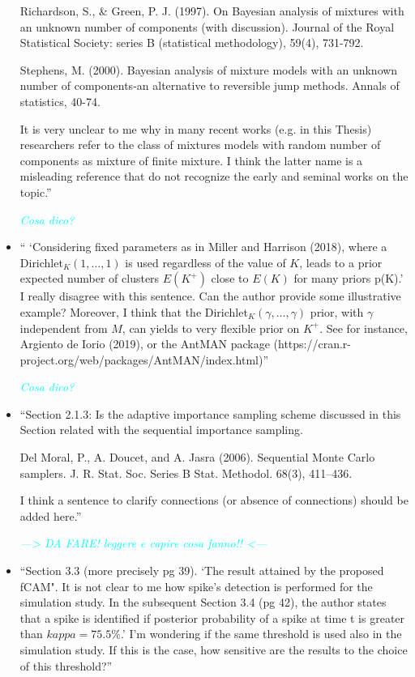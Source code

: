 \documentclass[11pt]{letter}
\begin{document}
\begin{itemize}
Richardson, S., \& Green, P. J. (1997). On Bayesian analysis of mixtures with an unknown number of components (with discussion). Journal of the Royal Statistical Society: series B (statistical methodology), 59(4), 731-792.

Stephens, M. (2000). Bayesian analysis of mixture models with an unknown number of components-an
alternative to reversible jump methods. Annals of statistics, 40-74.

It is very unclear to me why in many recent works (e.g. in this Thesis) researchers refer to the class of mixtures models with random number of components as mixture of finite mixture. I think the latter name is a misleading reference that do not recognize the early and seminal works on the topic.''\vskip1mm

{\em 
	\textcolor{cyan}{Cosa dico?}
}
\vskip3mm

%
\item `` `Considering fixed parameters as in Miller and Harrison (2018), where a Dirichlet$_K(1,\dots, 1)$ is used regardless of the value of $K$, leads to a prior expected number of clusters $E(K^+)$ close to $E(K)$ for many priors p(K).'\\
I really disagree with this sentence. Can the author provide some illustrative example? Moreover, I think that the Dirichlet$_K(\gamma,\dots, \gamma)$ prior, with $\gamma$ independent from $M$, can yields to very flexible prior on $K^+$. See for instance, Argiento de Iorio (2019), or the AntMAN package (https://cran.r-
project.org/web/packages/AntMAN/index.html)''\vskip1mm

{\em 
	\textcolor{cyan}{Cosa dico?}
}
\vskip3mm

%
\item ``Section 2.1.3:
Is the adaptive importance sampling scheme discussed in this Section related with the sequential importance
sampling.

Del Moral, P., A. Doucet, and A. Jasra (2006). Sequential Monte Carlo samplers. J. R. Stat. Soc. Series B Stat. Methodol. 68(3), 411–436.

I think a sentence to clarify connections (or absence of connections) should be added here.''\vskip1mm

{\em 
	\textcolor{cyan}{---> DA FARE! leggere e capire cosa fanno!! <---}
}
\vskip3mm

%
\item ``Section 3.3 (more precisely pg 39). `The result attained by the proposed fCAM".
It is not clear to me how spike's detection is performed for the simulation study. In the subsequent Section 3.4 (pg 42), the author states that a spike is identified if posterior probability of a spike at time t is greater than $kappa=75.5\%$.'
I'm wondering if the same threshold is used also in the simulation study. If this is the case, how sensitive are the results to the choice of this threshold?''\vskip1mm


\end{itemize}
\end{document}

